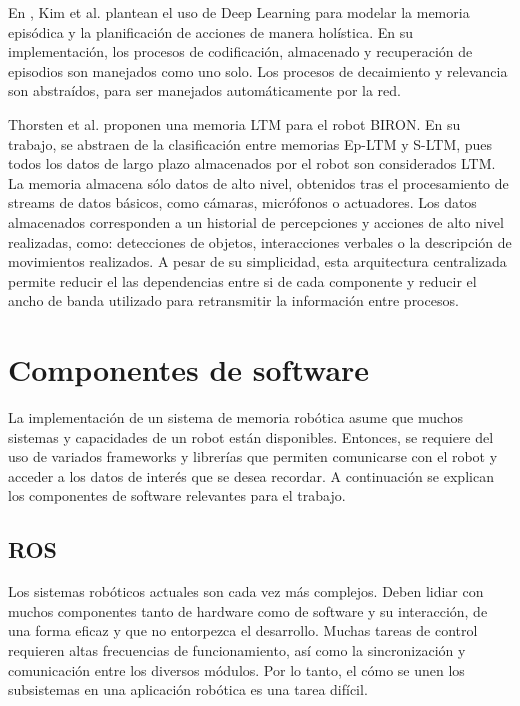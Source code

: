 En \cite{KimMinJoo2016}, Kim et al. plantean el uso de Deep Learning para modelar la memoria episódica y la planificación de acciones de manera holística. En su implementación, los procesos de codificación, almacenado y recuperación de episodios son manejados como uno solo. Los procesos de decaimiento y relevancia son abstraídos, para ser manejados automáticamente por la red.

Thorsten et al. \cite{Spexard2008} proponen una memoria LTM para el robot BIRON. En su trabajo, se abstraen de la clasificación entre memorias Ep-LTM y S-LTM, pues todos los datos de largo plazo almacenados por el robot son considerados LTM. La memoria almacena sólo datos de alto nivel, obtenidos tras el procesamiento de streams de datos básicos, como cámaras, micrófonos o actuadores. Los datos almacenados corresponden a un historial de percepciones y acciones de alto nivel realizadas, como: detecciones de objetos, interacciones verbales o la descripción de movimientos realizados. A pesar de su simplicidad, esta arquitectura centralizada permite reducir el las dependencias entre si de cada componente y reducir el ancho de banda utilizado para retransmitir la información entre procesos.





\section{Componentes de software}

La implementación de un sistema de memoria robótica asume que muchos sistemas y capacidades de un robot están disponibles. Entonces, se requiere del uso de variados frameworks y librerías que permiten comunicarse con el robot y acceder a los datos de interés que se desea recordar. A continuación se explican los componentes de software relevantes para el trabajo.

\subsection{ROS}

Los sistemas robóticos actuales son cada vez más complejos. Deben lidiar con muchos componentes tanto de hardware como de software y su interacción, de una forma eficaz y que no entorpezca el desarrollo. Muchas tareas de control requieren altas frecuencias de funcionamiento, así como la sincronización y comunicación entre los diversos módulos. Por lo tanto, el cómo se unen los subsistemas en una aplicación robótica es una tarea difícil.

